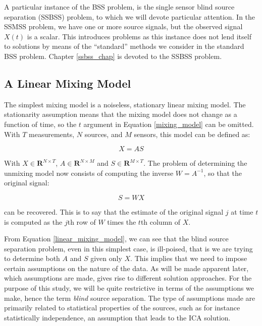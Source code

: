 \documentclass[11pt, oneside, a4paper]{report}
\begin{document}
A particular instance of the BSS problem, is the single sensor blind source separation (SSBSS) problem, to which we will devote particular attention. In the SSMSS problem, we have one or more source signals, but the observed signal $X(t)$ is a scalar. This introduces problems as this instance does not lend itself to solutions by means of the ``standard'' methods we consider in the standard BSS problem. Chapter \ref{ssbss_chap} is devoted to the SSBSS problem.

\subsection{A Linear Mixing Model}

The simplest mixing model is a noiseless, stationary linear mixing model. The stationarity assumption means that the mixing model does not change as a function of time, so the $t$ argument in Equation \ref{mixing_model} can be omitted. With $T$ measurements, $N$ sources, and $M$ sensors, this model can be defined as:


\begin{equation}\label{linear_mixing_model}
  X = AS
\end{equation}

With $X \in \mathbf{R}^{N\times T}$, $A \in \mathbf{R}^{N\times M}$
and $S \in \mathbf{R}^{M\times T}$. The problem of determining the
unmixing model now consists of computing the inverse $W = A^{-1}$, so
that the original signal:

\begin{equation}\label{linear_unmixing_model}
S = WX
\end{equation}

can be recovered. This is to say that the estimate of the original
signal $j$ at time $t$ is computed as the $j$th row of $W$ times the
$t$th column of $X$.

From Equation \ref{linear_mixing_model}, we can see that the blind source separation problem, even in this simplest case, is ill-poised, that is we are trying to determine both $A$ and $S$ given only $X$. This implies that we need to impose certain assumptions on the nature of the data. As will be made apparent later, which assumptions are made, gives rise to different solution approaches. For the purpose of this study, we will be quite restrictive in terms of the assumptions we make, hence the term \emph{blind} source separation. The type of assumptions made are primarily related to statistical properties of the sources, such as for instance statistically independence, an assumption that leads to the ICA solution.
\end{document}
